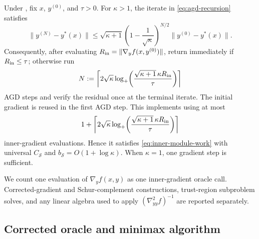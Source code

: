 \documentclass{article}
\begin{document}
\begin{proposition}
\label{prop:agd-implementation}
Under , fix $x$, $y^{(0)}$, and $\tau>0$.  For
$\kappa>1$, the iterate in \eqref{eq:agd-recursion} satisfies
\begin{equation}\label{eq:agd-contraction}
 \|y^{(N)}-y^*(x)\|
 \le\sqrt{\kappa+1}
 \left(1-\frac1{\sqrt\kappa}\right)^{N/2}
 \|y^{(0)}-y^*(x)\|.
\end{equation}
Consequently, after evaluating
$R_{\rm in}=\|\nabla_yf(x,y^{(0)})\|$, return immediately if
$R_{\rm in}\le\tau$; otherwise run
\[
 N:=\left\lceil2\sqrt\kappa\log_+\!\left(
  \frac{\sqrt{\kappa+1}\,\kappa R_{\rm in}}{\tau}
 \right)\right\rceil
\]
AGD steps and verify the residual once at the terminal iterate.  The
initial gradient is reused in the first AGD step.  This implements
 using at most
\begin{equation}\label{eq:agd-module-work}
 1+\left\lceil2\sqrt\kappa\log_+\!\left(
  \frac{\sqrt{\kappa+1}\,\kappa R_{\rm in}}{\tau}
 \right)\right\rceil
\end{equation}
inner-gradient evaluations.  Hence it satisfies
\eqref{eq:inner-module-work} with universal $C_{\mathcal S}$ and
$b_{\mathcal S}=O(1+\log\kappa)$.  When $\kappa=1$, one gradient step
is sufficient.
\end{proposition}




We count one evaluation of $\nabla_yf(x,y)$ as one inner-gradient
oracle call.  Corrected-gradient and Schur-complement constructions,
trust-region subproblem solves, and any linear algebra used to apply
$(\nabla^2_{yy}f)^{-1}$ are reported separately.

\subsection{Corrected oracle and minimax algorithm}
\end{document}

